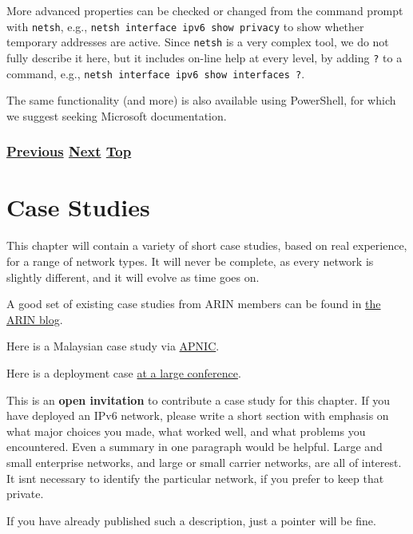 \documentclass[
]{article}
\begin{document}
More advanced properties can be checked or changed from the command
prompt with \texttt{netsh}, e.g.,
\texttt{netsh\ interface\ ipv6\ show\ privacy} to show whether temporary
addresses are active. Since \texttt{netsh} is a very complex tool, we do
not fully describe it here, but it includes on-line help at every level,
by adding \texttt{?} to a command, e.g.,
\texttt{netsh\ interface\ ipv6\ show\ interfaces\ ?}.

The same functionality (and more) is also available using PowerShell,
for which we suggest seeking Microsoft documentation.

\subsubsection{\texorpdfstring{\hyperref[packet-size-and-jumbo-frames]{Previous}
\hyperref[case-studies]{Next}
\hyperref[management-and-operations]{Top}}{Previous Next Top}}\label{previous-next-top-35}

\pagebreak

\section{Case Studies}\label{case-studies}

This chapter will contain a variety of short case studies, based on real
experience, for a range of network types. It will never be complete, as
every network is slightly different, and it will evolve as time goes on.

A good set of existing case studies from ARIN members can be found in
\href{https://www.arin.net/blog/ipv6/}{the ARIN blog}.

Here is a Malaysian case study via
\href{https://blog.apnic.net/2023/03/17/telekom-malaysias-ipv6-readiness-journey/}{APNIC}.

Here is a deployment case
\href{https://nsrc.org/blog/apricot-ipv6-only}{at a large conference}.

This is an \textbf{open invitation} to contribute a case study for this
chapter. If you have deployed an IPv6 network, please write a short
section with emphasis on what major choices you made, what worked well,
and what problems you encountered. Even a summary in one paragraph would
be helpful. Large and small enterprise networks, and large or small
carrier networks, are all of interest. It isn\textquotesingle t
necessary to identify the particular network, if you prefer to keep that
private.

If you have already published such a description, just a pointer will be
fine.
\end{document}
